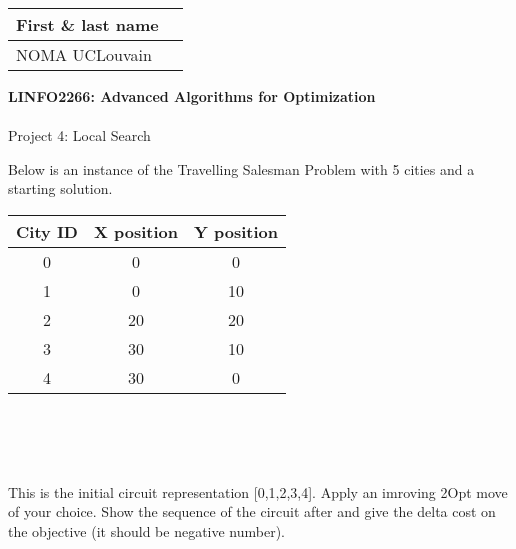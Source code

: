 \documentclass[12pt]{report}
\newcommand{\answerbox}[2]{\hfill\break\\
        \framebox[\linewidth]{\parbox[c][#1][c]{\dimexpr\linewidth-2\fboxsep-2\fboxrule}{#2}}
}
\begin{document}
\hfill
\begingroup
\Large
\begin{tabular}{|l|p{6cm}|}
    \hline
    First \& last name &
    \\ \hline
    NOMA UCLouvain & 
    \\ \hline
\end{tabular}
\endgroup
\vspace{1.5cm}

\noindent
\begingroup
    \Large
    \textbf{LINFO2266: Advanced Algorithms for Optimization}\\\\
    Project 4: Local Search
\endgroup
\vspace{0.2cm}

\begin{Exercise}[title={2Opt Move}]

Below is an instance of the Travelling Salesman Problem with 5 cities and a starting solution.

\begin{minipage}{0.5\textwidth}
\end{minipage}
\hfill
\begin{minipage}{0.4\textwidth}
\begin{tabular}{c|cc}
 City ID & X position & Y position \\ \hline
 0 & 0 & 0 \\
 1 & 0 & 10 \\
 2 & 20 & 20 \\
 3 & 30 & 10 \\
 4 & 30 & 0
\end{tabular}
\end{minipage}\\\\\

\Question This is the initial circuit representation [0,1,2,3,4]. Apply an imroving 2Opt move of your choice. Show the sequence of the circuit after and give the delta cost on the objective (it should be negative number).
\answerbox{6cm}{
}

\end{Exercise}
\end{document}
